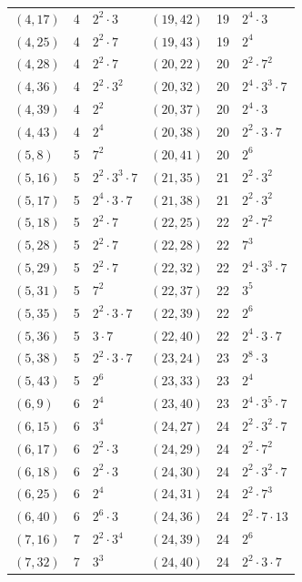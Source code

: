 \documentclass[11pt]{article}
\begin{document}
\begin{longtable}{@{}lrl@{\qquad}lrl@{}}
$(4,17)$ & 4 & $2^{2}\cdot 3$ & $(19,42)$ & 19 & $2^{4}\cdot 3$\\
$(4,25)$ & 4 & $2^{2}\cdot 7$ & $(19,43)$ & 19 & $2^{4}$\\
$(4,28)$ & 4 & $2^{2}\cdot 7$ & $(20,22)$ & 20 & $2^{2}\cdot 7^{2}$\\
$(4,36)$ & 4 & $2^{2}\cdot 3^{2}$ & $(20,32)$ & 20 & $2^{4}\cdot 3^{3}\cdot 7$\\
$(4,39)$ & 4 & $2^{2}$ & $(20,37)$ & 20 & $2^{4}\cdot 3$\\
$(4,43)$ & 4 & $2^{4}$ & $(20,38)$ & 20 & $2^{2}\cdot 3\cdot 7$\\
$(5,8)$ & 5 & $7^{2}$ & $(20,41)$ & 20 & $2^{6}$\\
$(5,16)$ & 5 & $2^{2}\cdot 3^{3}\cdot 7$ & $(21,35)$ & 21 & $2^{2}\cdot 3^{2}$\\
$(5,17)$ & 5 & $2^{4}\cdot 3\cdot 7$ & $(21,38)$ & 21 & $2^{2}\cdot 3^{2}$\\
$(5,18)$ & 5 & $2^{2}\cdot 7$ & $(22,25)$ & 22 & $2^{2}\cdot 7^{2}$\\
$(5,28)$ & 5 & $2^{2}\cdot 7$ & $(22,28)$ & 22 & $7^{3}$\\
$(5,29)$ & 5 & $2^{2}\cdot 7$ & $(22,32)$ & 22 & $2^{4}\cdot 3^{3}\cdot 7$\\
$(5,31)$ & 5 & $7^{2}$ & $(22,37)$ & 22 & $3^{5}$\\
$(5,35)$ & 5 & $2^{2}\cdot 3\cdot 7$ & $(22,39)$ & 22 & $2^{6}$\\
$(5,36)$ & 5 & $3\cdot 7$ & $(22,40)$ & 22 & $2^{4}\cdot 3\cdot 7$\\
$(5,38)$ & 5 & $2^{2}\cdot 3\cdot 7$ & $(23,24)$ & 23 & $2^{8}\cdot 3$\\
$(5,43)$ & 5 & $2^{6}$ & $(23,33)$ & 23 & $2^{4}$\\
$(6,9)$ & 6 & $2^{4}$ & $(23,40)$ & 23 & $2^{4}\cdot 3^{5}\cdot 7$\\
$(6,15)$ & 6 & $3^{4}$ & $(24,27)$ & 24 & $2^{2}\cdot 3^{2}\cdot 7$\\
$(6,17)$ & 6 & $2^{2}\cdot 3$ & $(24,29)$ & 24 & $2^{2}\cdot 7^{2}$\\
$(6,18)$ & 6 & $2^{2}\cdot 3$ & $(24,30)$ & 24 & $2^{2}\cdot 3^{2}\cdot 7$\\
$(6,25)$ & 6 & $2^{4}$ & $(24,31)$ & 24 & $2^{2}\cdot 7^{3}$\\
$(6,40)$ & 6 & $2^{6}\cdot 3$ & $(24,36)$ & 24 & $2^{2}\cdot 7\cdot 13$\\
$(7,16)$ & 7 & $2^{2}\cdot 3^{4}$ & $(24,39)$ & 24 & $2^{6}$\\
$(7,32)$ & 7 & $3^{3}$ & $(24,40)$ & 24 & $2^{2}\cdot 3\cdot 7$\\

\end{longtable}
\end{document}
